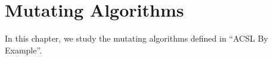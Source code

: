 \chapter{Mutating Algorithms}
\label{mutating}

In this chapter, we study the mutating algorithms defined in ``ACSL By
Example''.












